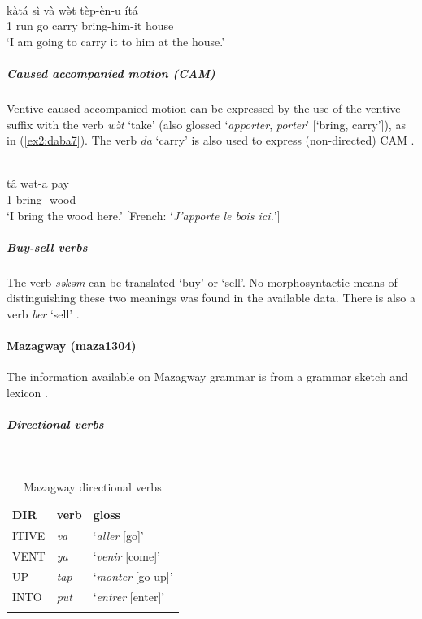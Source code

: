 \ea\label{ex2:daba6}
 \\
\gll kàtá	sì	và	wə̀t	tèp-èn-u	ítá \\
1	run	go	carry	bring-him-it	house \\
\glt `I am going to carry it to him at the house.' 
\z 

\subparagraph{Caused accompanied motion (CAM)}

Ventive caused accompanied motion can be expressed by the use of the ventive suffix with the verb \textit{wə̀t} `take' (also glossed `\textit{apporter}, \textit{porter}' [`bring, carry']), as in (\ref{ex2:daba7}). The verb \textit{da} `carry' is also used to express (non-directed) CAM \citep[45]{lienhardVerbeDaba1980}.

\ea\label{ex2:daba7}
 \\
\gll  tâ wət-a pay \\
1 bring- wood \\
\glt `I bring the wood here.' [French: `\textit{J'apporte le bois ici.}']
\z 

\subparagraph{Buy-sell verbs}

The verb \textit{səkəm} can be translated `buy' or `sell'. No morphosyntactic means of distinguishing these two meanings was found in the available data. There is also a verb \textit{ber} `sell' \citep{webonaryDictionnaireDaba2019}.

\paragraph*{Mazagway (maza1304)} \label{maza}

The information available on Mazagway grammar is from a grammar sketch and lexicon \citep{mouchetParlerDabaEsquisse1966}. 

\subparagraph{Directional verbs}~

\begin{table}[H]
\caption{Mazagway directional verbs} 
\label{tab:mazaV}
\begin{tabular}{lll} %
	\lsptoprule
	DIR & verb & gloss   \\ %
	\midrule
	ITIVE & \textit{va} & `\textit{aller} [go]' \\
	VENT & \textit{ya} & `\textit{venir} [come]' \\
	UP & \textit{tap} &`\textit{monter} [go up]' \\
	INTO& \textit{put} & `\textit{entrer} [enter]' \\
	\lspbottomrule
\end{tabular}
\end{table}

